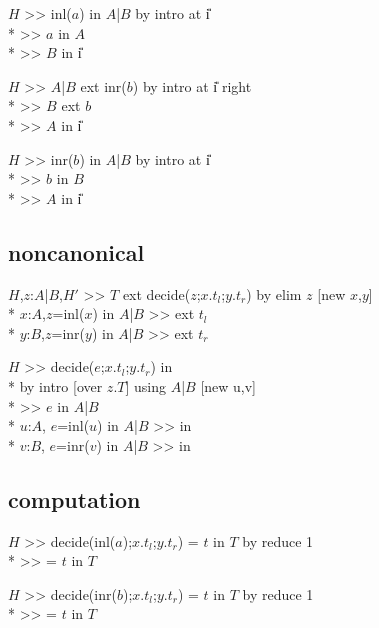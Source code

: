 \goalskip

\goal $H$ >> inl($a$) in $A$|$B$ by intro at \U{i} \\*
\subgoal >> $a$ in $A$ \\*
\subgoal >> $B$ in \U{i}

\goalskip

\goal $H$ >> $A$|$B$ ext inr($b$) by intro at \U{i} right \\*
\subgoal >> $B$ ext $b$\\*
\subgoal >> $A$ in \U{i}


\goalskip

\goal $H$ >> inr($b$) in $A$|$B$ by intro at \U{i} \\*
\subgoal >> $b$ in $B$ \\*
\subgoal >> $A$ in \U{i}

\subsection*{noncanonical}
\goal $H$,$z$:$A$|$B$,$H'$ >> $T$ 
          ext decide($z$;$x$.$t_l$;$y$.$t_r$)
	  by elim $z$ [new $x$,$y$] \\*
\subgoal $x$:$A$,$z$=inl($x$) in $A$|$B$ >>
          ext $t_l$\\*
\subgoal $y$:$B$,$z$=inr($y$) in $A$|$B$ >>
          ext $t_r$
\goalskip

\goal $H$ >> decide($e$;$x$.$t_l$;$y$.$t_r$) in  \\*
\continuegoal by intro [over $z$.$T$] using $A$|$B$ [new u,v] \\*
\subgoal  >> $e$ in $A$|$B$ \\*
\subgoal $u$:$A$, $e$=inl($u$) in $A$|$B$ >>
          in  \\*
\subgoal $v$:$B$, $e$=inr($v$) in $A$|$B$ >>
          in 

\subsection*{computation}
\goalgroup $H$ >> decide(inl($a$);$x$.$t_l$;$y$.$t_r$) = $t$ in $T$ by reduce 1 \\*
\subgoal  >>  = $t$ in $T$

\goalskip

\goal $H$ >> decide(inr($b$);$x$.$t_l$;$y$.$t_r$) = $t$ in $T$ by reduce 1 \\*
\subgoal  >>  = $t$ in $T$
\par

